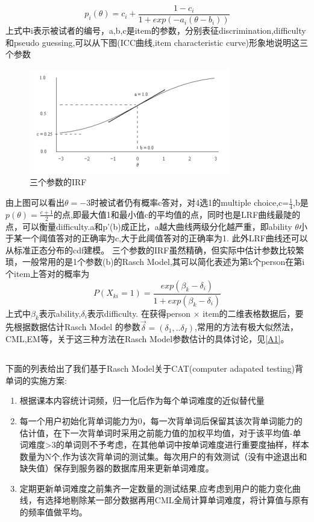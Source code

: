 \documentclass[12pt]{article}
\begin{document}
\begin{equation}
p_i(\theta)=c_i+\frac{1-c_i}{1+exp(-a_i(\theta-b_i))}
\end{equation}
上式中i表示被试者的编号，a,b,c是item的参数，分别表征discrimination,difficulty和pseudo guessing,可以从下图(ICC曲线,item characteristic curve)形象地说明这三个参数
\begin{figure}[!ht]
\caption{三个参数的IRF}
\includegraphics[width=\linewidth]{3PL_IRF.png}
\end{figure}

由上图可以看出$\theta=-3$时被试者仍有概率c答对，对4选1的multiple choice,c=$\frac{1}{4}$,b是$p(\theta)=\frac{c+1}{2}$的点,即最大值1和最小值c的平均值的点，同时也是LRF曲线最陡的点，可以衡量difficulty.a和p'(b)成正比，a越大曲线两级分化越严重，即ability $\theta$小于某一个阈值答对的正确率为c,大于此阈值答对的正确率为1.
此外LRF曲线还可以从标准正态分布的cdf建模。
三个参数的IRF虽然精确，但实际中估计参数比较繁琐，一般常用的是1个参数(b)的Rasch Model,其可以简化表述为第k个person在第i个item上答对的概率为
\begin{equation}\label{eq:Rasch}
P(X_{ki}=1)=\frac{exp(\beta_k-\delta_i)}{1+exp(\beta_k-\delta_i)}
\end{equation}
上式中$\beta_k$表示ability,$\delta_i$表示difficulty.
在获得person $\times$ item的二维表格数据后，要先根据数据估计Rasch Model 的参数$\vec{\delta}=(\delta_1,..\delta_I)$,常用的方法有极大似然法，CML,EM等，关于这三种方法在Rasch Model参数估计的具体讨论，见\ref{A1}。
\subsection{\textbf{}}
下面的列表给出了我们基于Rasch Model关于CAT(computer adapated testing)背单词的实施方案:
\begin{enumerate}
\item{根据课本内容统计词频，归一化后作为每个单词难度的近似替代量}
\item{每一个用户初始化背单词能力为0，每一次背单词后保留其该次背单词能力的估计值，在下一次背单词时采用之前能力值的加权平均值，对于该平均值-单词难度>3的单词则不予考虑，在其他单词中按单词难度进行重要度抽样，样本数量为N个,作为该次背单词的测试集。每次用户的有效测试（没有中途退出和缺失值）保存到服务器的数据库用来更新单词难度。}
\item{定期更新单词难度之前集齐一定数量的测试结果,应考虑到用户的能力变化曲线，有选择地剔除某一部分数据再用CML全局计算单词难度，将计算值与原有的频率值做平均。}
\end{enumerate}
\end{document}
